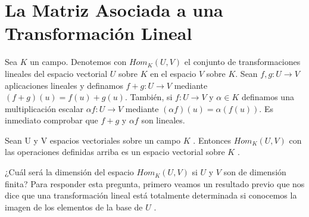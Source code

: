  		\section{ La Matriz Asociada a una Transformación Lineal }
 		Sea $ K $ un campo. Denotemos con $ Hom_{K} (U, V )$ el conjunto de transformaciones lineales del espacio vectorial $ U $ sobre $ K $ en el espacio $ V $ sobre $ K $. Sean $ f, g: U \rightarrow V $ aplicaciones lineales y definamos  $ f + g: U \rightarrow V $ mediante $ (f + g)(u) = f (u) +
 		g(u) $. También, si $ f : U \rightarrow V $ y $ \alpha \in K $ definamos una multiplicación escalar $ \alpha f : U \rightarrow V $ mediante $ (\alpha f )(u) = \alpha(f (u)) $. Es inmediato comprobar que $ f + g $ y $ \alpha f $ son lineales. 
 		
 		\begin{teo}
 			 Sean U y V espacios vectoriales sobre un campo $ K $ . Entonces $ Hom_{K} (U, V ) $ con las operaciones definidas arriba es un espacio vectorial sobre $ K $ .
 		\end{teo}
 		¿Cuál será la dimensión del espacio $ Hom_{K} (U, V ) $ si $ U $ y $ V $ son de dimensión finita? Para responder esta pregunta, primero veamos un resultado previo que nos dice que una transformación lineal está totalmente determinada si conocemos la imagen de los elementos de la base de $ U $ .
 		
